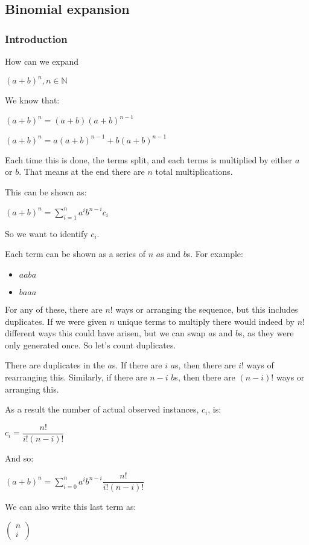 
\subsection{Binomial expansion}

\subsubsection{Introduction}

How can we expand

\((a+b)^n, n\in \mathbb{N}\)

We know that:

\((a+b)^n=(a+b)(a+b)^{n-1}\)

\((a+b)^n=a(a+b)^{n-1}+b(a+b)^{n-1}\)

Each time this is done, the terms split, and each terms is multiplied by either \(a\) or \(b\). That means at the end there are \(n\) total multiplications.

This can be shown as:

\((a+b)^n=\sum_{i=1}^n a^i b^{n-i} c_i\)

So we want to identify \(c_i\).

Each term can be shown as a series of \(n\) \(a\)s and \(b\)s. For example:

\begin{itemize}
\item \(aaba\)
\item \(baaa\)
\end{itemize}

For any of these, there are \(n!\) ways or arranging the sequence, but this includes duplicates. If we were given \(n\) unique terms to multiply there would indeed by \(n!\) different ways this could have arisen, but we can swap \(a\)s and \(b\)s, as they were only generated once. So let's count duplicates.

There are duplicates in the \(a\)s. If there are  \(i\) \(a\)s, then there are \(i!\) ways of rearranging this. Similarly, if there are \(n-i\) \(b\)s, then there are \((n-i)!\) ways or arranging this.

As a result the number of actual observed instances, \(c_i\), is:

\(c_i=\dfrac{n!}{i!(n-i)!}\)

And so:

\((a+b)^n=\sum^n_{i=0} a^i b^{n-i} \dfrac{n!}{i!(n-i)!}\)

We can also write this last term as:

\(\begin{pmatrix}n\\i\end{pmatrix}\)

